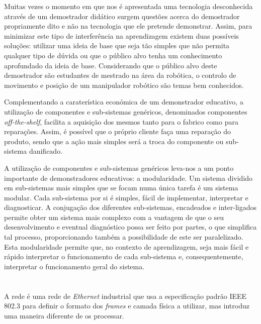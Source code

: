 Muitas vezes o momento em que nos é apresentada uma tecnologia desconhecida
através de um demostrador didático surgem questões acerca do demostrador
propriamente dito e não na tecnologia que ele pretende demonstrar. Assim,
para minimizar este tipo de interferência na aprendizagem existem duas
possíveis soluções: utilizar uma ideia de base que seja tão simples que
não permita qualquer tipo de dúvida ou que o público alvo tenha um
conhecimento aprofundado da ideia de base. Considerando que o público alvo
deste demostrador são estudantes de mestrado na área da robótica,
o controlo de movimento e posição de um manipulador robótico são temas
bem conhecidos.

Complementando a caraterística económica de um demonstrador educativo,
a utilização de componentes e sub-sistemas genéricos, denominados
componentes \emph{off-the-shelf}, facilita a aquisição dos mesmos tanto
para o fabrico como para reparações. Assim, é possível que o próprio
cliente faça uma reparação do produto, sendo que a ação mais simples será
a troca do componente ou sub-sistema danificado.

A utilização de componentes e sub-sistemas genéricos leva-nos a um ponto
importante de demonstradores educativos: a modularidade. Um sistema
dividido em sub-sistemas mais simples que se focam numa única tarefa é um
sistema modular. Cada sub-sistema por si é simples, fácil de implementar,
interpretar e diagnosticar. A conjugação dos diferentes sub-sistemas,
encadeados e inter-ligados permite obter um sistema mais complexo com a
vantagem de que o seu desenvolvimento e eventual diagnóstico possa ser
feito por partes, o que simplifica tal processo, proporcionando também a
possibilidade de este ser paralelizado. Esta modularidade permite que,
no contexto de aprendizagem, seja mais fácil e rápido interpretar o
funcionamento de cada sub-sistema e, consequentemente, interpretar o
funcionamento geral do sistema.

% 


\section{\ecat}\label{sec:ethercat}

A rede \ecat é uma rede de \emph{Ethernet} industrial que usa a
especificação padrão IEEE 802.3 \cite[]{ieee:IEEEStandardEthernet} para
definir o formato dos \emph{frames} e camada física a utilizar, mas
introduz uma maneira diferente de os processar.


